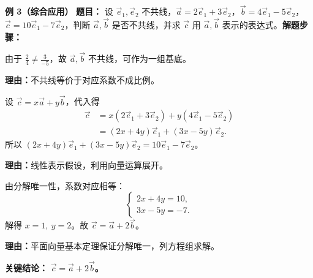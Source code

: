 \begin{examplebox}
	\medskip
	\textbf{\textcolor{CExample}{例 3（综合应用）}}
	\textbf{\textcolor{CExample}{题目：}} 设 $\vec{e}_1,\vec{e}_2$ 不共线，$\vec{a}=2\vec{e}_1+3\vec{e}_2$，$\vec{b}=4\vec{e}_1-5\vec{e}_2$，$\vec{c}=10\vec{e}_1-7\vec{e}_2$，判断 $\vec{a},\vec{b}$ 是否不共线，并求 $\vec{c}$ 用 $\vec{a},\vec{b}$ 表示的表达式。\textbf{\textcolor{CExample}{解题步骤：}}
	\begin{description}[style=nextline, leftmargin=2.8em, labelsep=0.5em, itemsep=0.45em]
		\item[\textbf{第一步（基底共线判定）：}]
			由于 $\frac{2}{4}\neq\frac{3}{-5}$，故 $\vec{a},\vec{b}$ 不共线，可作为一组基底。
			\par\textbf{理由：}不共线等价于对应系数不成比例。
		\item[\textbf{第二步（设元展开）：}]
			设 $\vec{c}=x\vec{a}+y\vec{b}$，代入得
			\[
				\begin{aligned}
					\vec{c} &= x(2\vec{e}_1+3\vec{e}_2)+y(4\vec{e}_1-5\vec{e}_2) \\&= (2x+4y)\vec{e}_1+(3x-5y)\vec{e}_2.
			\end{aligned}
			\]
			所以 $(2x+4y)\vec{e}_1+(3x-5y)\vec{e}_2=10\vec{e}_1-7\vec{e}_2$。
			\par\textbf{理由：}线性表示假设，利用向量运算展开。
		\item[\textbf{第三步（比较系数求解）：}]
			由分解唯一性，系数对应相等：
			\[
				\begin{cases}
					2x+4y = 10,\\3x-5y = -7.
			\end{cases}
			\]
			解得 $x=1,\ y=2$。故 $\vec{c}=\vec{a}+2\vec{b}$。
			\par\textbf{理由：}平面向量基本定理保证分解唯一，列方程组求解。
	\end{description}
	\textbf{\textcolor{CExample}{关键结论：}}
	\textbf{$\vec{c}=\vec{a}+2\vec{b}$。}
\end{examplebox}

